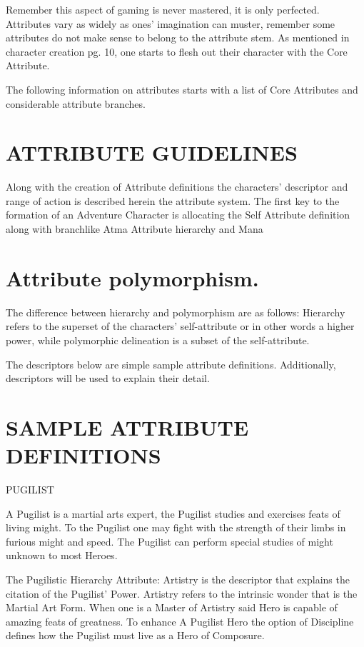 \documentclass{article}
\begin{document}
	Remember this aspect of gaming is never mastered, it is only perfected. Attributes vary as widely
as ones’ imagination can muster, remember some attributes do not make sense to belong to the
attribute stem. As mentioned in character creation pg. 10, one starts to flesh out their character
with the Core Attribute.

	The following information on attributes starts with a list of Core Attributes and considerable
attribute branches.

\section{ATTRIBUTE GUIDELINES}

	Along with the creation of Attribute definitions the characters’ descriptor and range of action is
described herein the attribute system. The first key to the formation of an Adventure Character is
allocating the Self Attribute definition along with branchlike Atma Attribute hierarchy and Mana

\section{Attribute polymorphism.}

	The difference between hierarchy and polymorphism are as follows: Hierarchy refers to the
superset of the characters’ self-attribute or in other words a higher power, while polymorphic
delineation is a subset of the self-attribute.

	The descriptors below are simple sample attribute definitions. Additionally, descriptors will be
used to explain their detail.

\section{SAMPLE ATTRIBUTE DEFINITIONS}

PUGILIST

	A Pugilist is a martial arts expert, the Pugilist studies and exercises feats of living might. To the
Pugilist one may fight with the strength of their limbs in furious might and speed. The Pugilist
can perform special studies of might unknown to most Heroes.

	The Pugilistic Hierarchy Attribute: Artistry is the descriptor that explains the citation of the
Pugilist’ Power. Artistry refers to the intrinsic wonder that is the Martial Art Form.
When one is a Master of Artistry said Hero is capable of amazing feats of greatness. To enhance
A Pugilist Hero the option of Discipline defines how the Pugilist must live as a Hero of
Composure.
\end{document}
